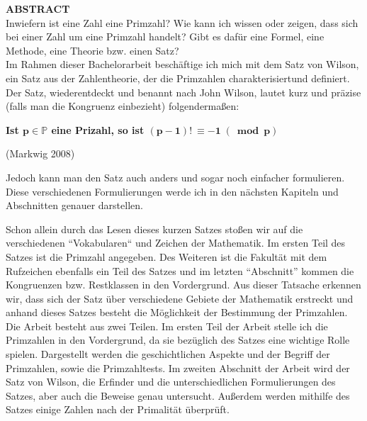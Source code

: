 %
%
{\LARGE \textbf{ABSTRACT}}\\

Inwiefern ist eine Zahl eine Primzahl? Wie kann ich wissen oder zeigen,
dass sich bei einer Zahl um eine Primzahl handelt? Gibt es dafür eine
Formel, eine Methode, eine Theorie bzw. einen Satz?\\

Im Rahmen dieser Bachelorarbeit beschäftige ich mich mit dem Satz von
Wilson, ein Satz aus der Zahlentheorie, der die Primzahlen
charakterisiertund definiert. Der Satz, wiederentdeckt und benannt nach
John Wilson, lautet kurz und präzise (falls man die Kongruenz einbezieht)
folgendermaßen:

\begin{center}
    \textbf{Ist $\bm{p \in \mathbb{P}}$ eine Prizahl, so ist $\bm{(p-1)! \:\equiv -1 \;(\bmod p)}$}
    
    (Markwig 2008)
\end{center}

Jedoch kann man den Satz auch anders und sogar noch einfacher formulieren.
Diese verschiedenen Formulierungen werde ich in den nächsten Kapiteln und
Abschnitten genauer darstellen.

Schon allein durch das Lesen dieses kurzen Satzes stoßen wir auf die
verschiedenen ``Vokabularen`` und Zeichen der Mathematik. Im ersten Teil
des Satzes ist die Primzahl angegeben. Des Weiteren ist die Fakultät mit
dem Rufzeichen ebenfalls ein Teil des Satzes und im letzten ``Abschnitt''
kommen die Kongruenzen bzw. Restklassen in den Vordergrund. Aus dieser
Tatsache erkennen wir, dass sich der Satz über verschiedene Gebiete der
Mathematik erstreckt und anhand dieses Satzes besteht die Möglichkeit
der Bestimmung der Primzahlen.\\

Die Arbeit besteht aus zwei Teilen. Im ersten Teil der Arbeit stelle ich
die Primzahlen in den Vordergrund, da sie bezüglich des Satzes eine
wichtige Rolle spielen. Dargestellt werden die geschichtlichen Aspekte
und der Begriff der Primzahlen, sowie die Primzahltests.
Im zweiten Abschnitt der Arbeit wird der Satz von Wilson, die Erfinder
und die unterschiedlichen Formulierungen des Satzes, aber auch die
Beweise genau untersucht. Außerdem werden mithilfe des Satzes einige
Zahlen nach der Primalität überprüft.
\newpage
